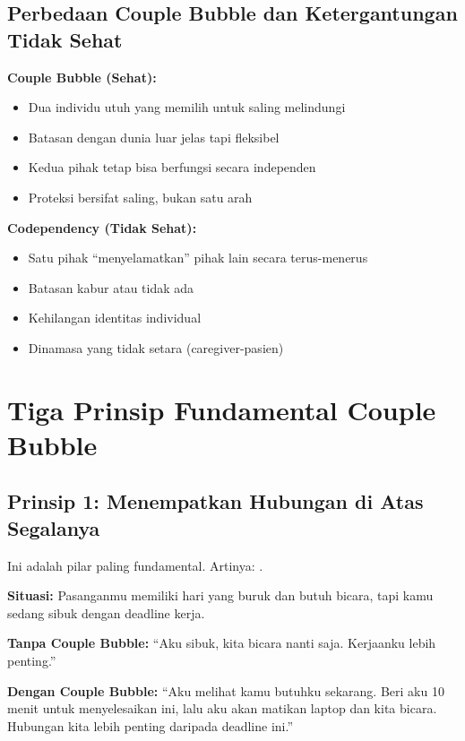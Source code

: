 \subsection{Perbedaan Couple Bubble dan Ketergantungan Tidak Sehat}

\begin{warningbox}
\textbf{Couple Bubble (Sehat):}
\begin{itemize}
    \item Dua individu utuh yang memilih untuk saling melindungi
    \item Batasan dengan dunia luar jelas tapi fleksibel
    \item Kedua pihak tetap bisa berfungsi secara independen
    \item Proteksi bersifat saling, bukan satu arah
\end{itemize}

\textbf{Codependency (Tidak Sehat):}
\begin{itemize}
    \item Satu pihak ``menyelamatkan'' pihak lain secara terus-menerus
    \item Batasan kabur atau tidak ada
    \item Kehilangan identitas individual
    \item Dinamasa yang tidak setara (caregiver-pasien)
\end{itemize}
\end{warningbox}

\section{Tiga Prinsip Fundamental Couple Bubble}

\subsection{Prinsip 1: Menempatkan Hubungan di Atas Segalanya}

Ini adalah pilar paling fundamental. Artinya: .

\begin{tipbox}
\textbf{Situasi:} Pasanganmu memiliki hari yang buruk dan butuh bicara, tapi kamu sedang sibuk dengan deadline kerja.

\textbf{Tanpa Couple Bubble:} ``Aku sibuk, kita bicara nanti saja. Kerjaanku lebih penting.''

\textbf{Dengan Couple Bubble:} ``Aku melihat kamu butuhku sekarang. Beri aku 10 menit untuk menyelesaikan ini, lalu aku akan matikan laptop dan kita bicara. Hubungan kita lebih penting daripada deadline ini.''
\end{tipbox}

